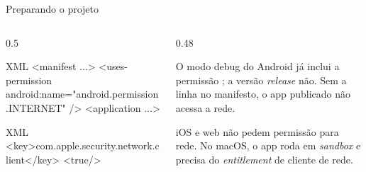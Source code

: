 \documentclass[aspectratio=169,10pt]{beamer}
\begin{document}
\begin{frame}[fragile]{Preparando o projeto}
  \begin{columns}[T]
    \begin{column}{0.5\textwidth}
\begin{codigo}[title=android/app/src/main/AndroidManifest.xml]{XML}
<manifest ...>
  <uses-permission
      android:name="android.permission.INTERNET" />
  <application ...>
\end{codigo}
\begin{codigo}[title=macos/Runner/*.entitlements]{XML}
<key>com.apple.security.network.client</key>
<true/>
\end{codigo}
    \end{column}
    \begin{column}{0.48\textwidth}
      \begin{erro}
        O modo debug do Android já inclui a permissão ; a versão \emph{release} não. Sem a linha no manifesto, o app publicado não acessa a rede.
      \end{erro}
      \begin{conceito}[Plataformas]
        iOS e web não pedem permissão para rede. No macOS, o app roda em \emph{sandbox} e precisa do \emph{entitlement} de cliente de rede.
      \end{conceito}
    \end{column}
  \end{columns}
\end{frame}
\end{document}
